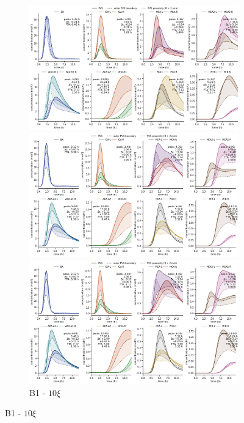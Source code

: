 \documentclass[fleqn,10pt]{wlscirep}
\begin{document}
\begin{figure}
\begin{subfigure}{0.5 \linewidth}
    \centering
    \includegraphics[width=1\linewidth]{figures/modelA_conc_at_label.png}
    \caption{B1 - $\xi$}
    \includegraphics[width=1\linewidth]{figures/modelB1-10_conc_at_label.png}
    \caption{B1 - $10 \xi$}
    \includegraphics[width=1\linewidth]{figures/modelB1-100_conc_at_label.png}

\end{subfigure}
\end{figure}
\end{document}
